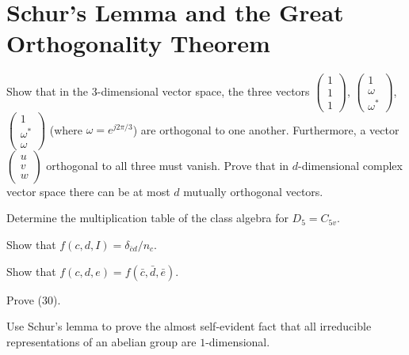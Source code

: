 \documentclass[../group-theory-in-a-nutshell-for-physicists.tex]{subfiles}
\begin{document}
\printanswers

\section{Schur's Lemma and the Great Orthogonality Theorem}

\begin{questions}

\question Show that in the $3$-dimensional vector space, the three vectors $\begin{pmatrix}1\\1\\1\end{pmatrix}$, $\begin{pmatrix}1\\ \omega \\ \omega^*\end{pmatrix}$, $\begin{pmatrix}1 \\ \omega^* \\ \omega\end{pmatrix}$ (where $\omega = e^{j2\pi/3}$) are orthogonal to one another. Furthermore, a vector $\begin{pmatrix}u \\ v \\ w\end{pmatrix}$ orthogonal to all three must vanish. Prove that in $d$-dimensional complex vector space there can be at most $d$ mutually orthogonal vectors.

\question Determine the multiplication table of the class algebra for $D_5 = C_{5v}$.

\question Show that $f(c, d, I) = \delta_{\bar{c}d}/n_c$.

\question Show that $f(c, d, e) = f(\bar{c}, \bar{d}, \bar{e})$.

\question Prove (30).

\question Use Schur's lemma to prove the almost self-evident fact that all irreducible representations of an abelian group are $1$-dimensional.

\end{questions}
\end{document}
